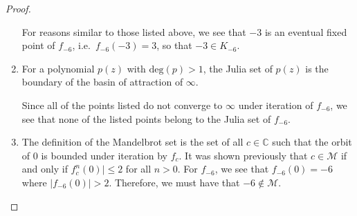 \begin{proof}
\begin{enumerate}
      For reasons similar to those listed above, we see that $-3$ is an eventual fixed point of
      $f_{-6}$, i.e.\ $f_{-6}(-3) = 3$, so that $-3 \in K_{-6}$.

    \item For a polynomial $p(z)$ with $\text{deg}(p) > 1$, the Julia
      set of $p(z)$ is the boundary of the basin of attraction of $\infty$.

      Since all of the points listed do not converge to $\infty$ under iteration of $f_{-6}$,
      we see that none of the listed points belong to the Julia set of $f_{-6}$.

    \item The definition of the Mandelbrot set
      is the set of all $c \in \mathbb{C}$ such that the orbit of 0 is bounded under iteration by $f_{c}$.
      It was shown previously that $c \in \mathcal{M}$ if and only if $f_c^n(0)| \leq 2$ for all $n > 0$.
      For $f_{-6}$, we see that $f_{-6}(0) = -6$ where $|f_{-6}(0)| > 2$. Therefore,
      we must have that $-6 \notin \mathcal{M}$.
  \end{enumerate}
\end{proof}
\newpage
